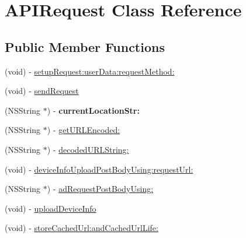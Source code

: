 \hypertarget{interface_a_p_i_request}{
\section{APIRequest Class Reference}
\label{interface_a_p_i_request}
}
\subsection*{Public Member Functions}
\begin{DoxyCompactItemize}
\item 
(void) -\/ \hyperlink{interface_a_p_i_request_ae754d003136a832f7711e49ca81176e1}{setupRequest:userData:requestMethod:}
\item 
(void) -\/ \hyperlink{interface_a_p_i_request_aacc8c0cefb7b93bd32466980f5f06671}{sendRequest}
\item 
\hypertarget{interface_a_p_i_request_a4ceed4b37a3e1e12b67a7d86d05dc017}{
(NSString $\ast$) -\/ {\bfseries currentLocationStr:}}
\label{interface_a_p_i_request_a4ceed4b37a3e1e12b67a7d86d05dc017}

\item 
(NSString $\ast$) -\/ \hyperlink{interface_a_p_i_request_ac0fdffb3608aa1fc065aa7bd33570653}{getURLEncoded:}
\item 
(NSString $\ast$) -\/ \hyperlink{interface_a_p_i_request_af1c709eaaaa291dc6d9334fe21fd9ec2}{decodedURLString:}
\item 
(void) -\/ \hyperlink{interface_a_p_i_request_aa1cedc6934b310f2bc9f79dbaecb3c88}{deviceInfoUploadPostBodyUsing:requestUrl:}
\item 
(NSString $\ast$) -\/ \hyperlink{interface_a_p_i_request_a676aa8b97845329c1a701fa8e3b9b0db}{adRequestPostBodyUsing:}
\item 
(void) -\/ \hyperlink{interface_a_p_i_request_aa6e88c01ae4d6925b1501050e9d13afe}{uploadDeviceInfo}
\item 
(void) -\/ \hyperlink{interface_a_p_i_request_ab17ea791c42abb329b8d1c95ad210370}{storeCachedUrl:andCachedUrlLife:}
\end{DoxyCompactItemize}
